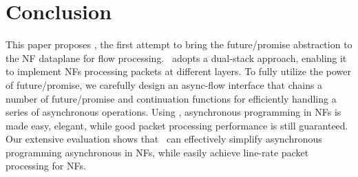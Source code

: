 \section{Conclusion}

This paper proposes \netstar, the first attempt to bring the future/promise abstraction to the NF dataplane for flow processing.  \netstar~adopts a dual-stack approach, enabling it to implement NFs processing packets at different layers. To fully utilize the power of future/promise, we carefully design an async-flow interface that chains a number of future/promise and continuation functions for efficiently handling a series of asynchronous operations. Using \netstar, asynchronous programming in NFs is made easy, elegant, while good packet processing performance is still guaranteed. Our extensive evaluation shows that \netstar~can effectively simplify asynchronous programming asynchronous in NFs, while easily achieve line-rate packet processing for NFs.
